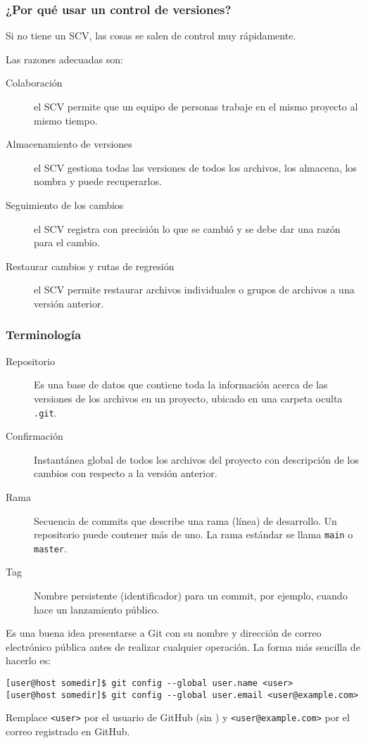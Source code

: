 \begin{frame}
	\frametitle{¿Por qué usar un control de versiones?}
	Si no tiene un SCV, las cosas se salen de control muy
	rápidamente.

	Las razones adecuadas son:
	\begin{description}
		\item[Colaboración] el SCV permite que un equipo de personas
			trabaje en el mismo proyecto al mismo tiempo.
		\item[Almacenamiento de versiones] el SCV gestiona todas las
			versiones de todos los archivos, los almacena, los nombra y
			puede recuperarlos.
		\item[Seguimiento de los cambios] el SCV registra con precisión
			lo que se cambió y se debe dar una razón para el cambio.
		\item[Restaurar cambios y rutas de regresión] el SCV permite
			restaurar archivos individuales o grupos de archivos a una
			versión anterior.
	\end{description}
\end{frame}

\begin{frame}
	\frametitle{Terminología
		📖}
	\begin{description}
		\item[Repositorio]

			Es una base de datos que contiene toda la información acerca de las versiones de los archivos en un proyecto, ubicado en una carpeta oculta \lstinline|.git|.

		\item[Confirmación]

			Instantánea global de todos los archivos del proyecto con descripción de los cambios con respecto a la versión anterior.

		\item[Rama]

			Secuencia de commits que describe una rama (línea) de desarrollo. Un repositorio puede contener más de uno. La rama estándar se llama \lstinline|main| o \lstinline|master|.

		\item[Tag]

			Nombre persistente (identificador) para un commit, por ejemplo, cuando hace un lanzamiento público.
	\end{description}
\end{frame}

\begin{frame}[fragile]
	Es una buena idea presentarse a Git con su nombre y dirección de
	correo electrónico pública antes de realizar cualquier operación.
	La forma más sencilla de hacerlo es:

	\begin{verbatim}
[user@host somedir]$ git config --global user.name <user>
[user@host somedir]$ git config --global user.email <user@example.com>
		\end{verbatim}
	Remplace \lstinline|<user>| por el
	usuario de GitHub (sin \MVAt) y
	\lstinline|<user@example.com>| por el correo
	registrado en GitHub.
\end{frame}


